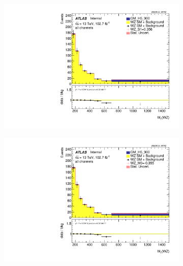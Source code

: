 \documentclass[../Bachelorarbeit.tex]{subfiles}
\begin{document}
\begin{figure}[h]

    \centering
    \begin{subfigure}{0.35\textwidth}
        \includegraphics[width=\textwidth]{Plots/ALL_MTWZ_right_color/GM_H5_900/S1/2022-05-07/VBSSR/all_VV_MTWZ.pdf}
    \end{subfigure}
    \begin{subfigure}{0.35\textwidth}
        \includegraphics[width=\textwidth]{Plots/ALL_MTWZ_right_color/GM_H5_900/M0/2022-05-07/VBSSR/all_VV_MTWZ.pdf}
    \end{subfigure}
    \begin{subfigure}{0.35\textwidth}

\end{subfigure}
\end{figure}
\end{document}
